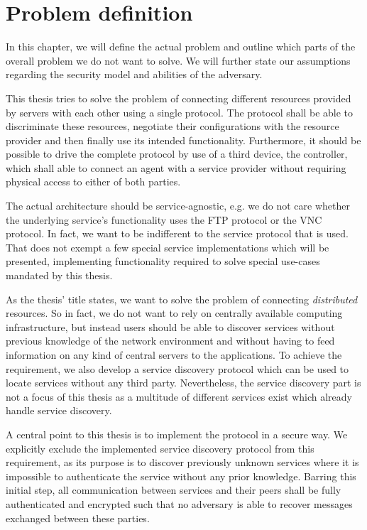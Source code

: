 \section{Problem definition}

In this chapter, we will define the actual problem and outline which parts of the overall problem we do not want to solve.
We will further state our assumptions regarding the security model and abilities of the adversary.

This thesis tries to solve the problem of connecting different resources provided by servers with each other using a single protocol.
The protocol shall be able to discriminate these resources, negotiate their configurations with the resource provider and then finally use its intended functionality.
Furthermore, it should be possible to drive the complete protocol by use of a third device, the controller, which shall able to connect an agent with a service provider without requiring physical access to either of both parties.

The actual architecture should be service-agnostic, e.g. we do not care whether the underlying service's functionality uses the FTP protocol or the VNC protocol.
In fact, we want to be indifferent to the service protocol that is used.
That does not exempt a few special service implementations which will be presented, implementing functionality required to solve special use-cases mandated by this thesis.

As the thesis' title states, we want to solve the problem of connecting \emph{distributed} resources.
So in fact, we do not want to rely on centrally available computing infrastructure, but instead users should be able to discover services without previous knowledge of the network environment and without having to feed information on  any kind of central servers to the applications.
To achieve the requirement, we also develop a service discovery protocol which can be used to locate services without any third party.
Nevertheless, the service discovery part is not a focus of this thesis as a multitude of different services exist which already handle service discovery.

A central point to this thesis is to implement the protocol in a secure way.
We explicitly exclude the implemented service discovery protocol from this requirement, as its purpose is to discover previously unknown services where it is impossible to authenticate the service without any prior knowledge.
Barring this initial step, all communication between services and their peers shall be fully authenticated and encrypted such that no adversary is able to recover messages exchanged between these parties.

